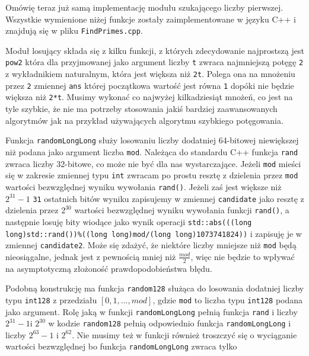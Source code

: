 \documentclass{article}
\begin{document}
Omówię teraz już samą implementację modułu szukającego liczby pierwszej. Wszystkie wymienione niżej funkcje zostały  zaimplementowane w języku C++ i znajdują się w pliku \texttt{FindPrimes.cpp}.

Moduł losujący składa się z kilku funkcji, z których zdecydowanie najprostszą jest \texttt{pow2} która dla przyjmowanej jako argument liczby \texttt{t}
zwraca najmniejszą potęgę \texttt{2} z wykładnikiem naturalnym, która jest większa niż \texttt{2t}. Polega ona na
mnożeniu przez \texttt{2} zmiennej \texttt{ans} której początkowa wartość jest równa \texttt{1} dopóki nie będzie 
większa niż \texttt{2*t}. Musimy wykonać co najwyżej kilkadziesiąt mnożeń, co jest na tyle szybkie, że nie ma 
potrzeby stosowania jakiś bardziej zaawansowanych algorytmów jak na przykład 
używających algorytmu szybkiego potęgowania.

Funkcja \texttt{randomLongLong} służy losowaniu liczby dodatniej 64-bitowej niewiększej niż podana jako argument 
liczba \texttt{mod}. Należąca do standardu C++ funkcja \texttt{rand} zwraca liczby 32-bitowe, co może nie być dla nas
wystarczające. Jeżeli \texttt{mod} mieści się w zakresie zmiennej typu \texttt{int} zwracam po prostu resztę z dzielenia przez \texttt{mod} wartości bezwzględnej
wyniku wywołania \texttt{rand()}. Jeżeli zaś jest większe niż $2^{31}-1$ \texttt{31} ostatnich bitów wyniku zapisujemy w zmiennej \texttt{candidate} jako resztę z dzielenia przez $2^{30}$ wartości bezwzględnej wyniku wywołania funkcji \texttt{rand()},
a następnie losuję bity wiodące jako wynik  operacji \texttt{std::abs(((long long)std::rand())\%((long long)mod/(long long)1073741824))} i zapisuję je w zmiennej \texttt{candidate2}. Może się zdażyć, że niektóre liczby mniejsze niż 
\texttt{mod} będą nieosiągalne, jednak jest z pewnością mniej niż $\frac{mod}{2}$, więc nie będzie to wpływać na 
asymptotyczną złożoność prawdopodobieństwa błędu. 

Podobną konstrukcję ma funkcja \texttt{random128} służąca do losowania dodatniej liczby typu
\texttt{\textunderscore \textunderscore int128} z przedziału $[0,1,...,mod]$, gdzie \texttt{mod}
to liczba typu \texttt{\textunderscore \textunderscore int128} podana jako argument. 
Rolę jaką w funkcji \texttt{randomLongLong} pełnią funkcja \texttt{rand} i liczby $2^{31}-1$i $2^{30}$ w kodzie \texttt{random128} pełnią odpowiednio
funkcja \texttt{randomLongLong} i liczby $2^{63}-1$ i $2^{62}$. Nie musimy też w funkcji również troszczyć
się o wyciąganie wartości bezwzględnej bo funkcja \texttt{randomLongLong} zwraca tylko
\end{document}
